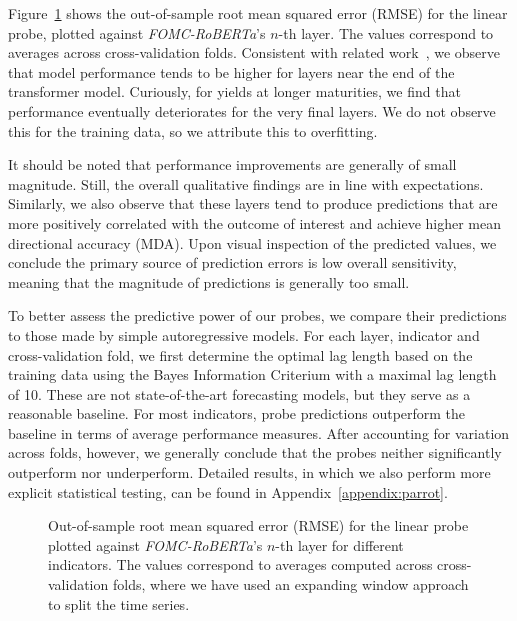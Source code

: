 \documentclass{article}
\theoremstyle{plain}
\theoremstyle{definition}
\theoremstyle{remark}
\begin{document}
Figure~\ref{fig-fomc} shows the out-of-sample root mean squared error (RMSE) for the linear probe, plotted against \emph{FOMC-RoBERTa}'s \(n\)-th layer. The values correspond to averages across cross-validation folds. Consistent with related work~\citep{alain2018understanding,gurnee2023languagev2}, we observe that model performance tends to be higher for layers near the end of the transformer model. Curiously, for yields at longer maturities, we find that performance eventually deteriorates for the very final layers. We do not observe this for the training data, so we attribute this to overfitting. 


It should be noted that performance improvements are generally of small magnitude. Still, the overall qualitative findings are in line with expectations. Similarly, we also observe that these layers tend to produce predictions that are more positively correlated with the outcome of interest and achieve higher mean directional accuracy (MDA). Upon visual inspection of the predicted values, we conclude the primary source of prediction errors is low overall sensitivity, meaning that the magnitude of predictions is generally too small. 

To better assess the predictive power of our probes, we compare their predictions to those made by simple autoregressive models. For each layer, indicator and cross-validation fold, we first determine the optimal lag length based on the training data using the Bayes Information Criterium with a maximal lag length of 10. These are not state-of-the-art forecasting models, but they serve as a reasonable baseline. For most indicators, probe predictions outperform the baseline in terms of average performance measures. After accounting for variation across folds, however, we generally conclude that the probes neither significantly outperform nor underperform. Detailed results, in which we also perform more explicit statistical testing, can be found in Appendix~\ref{appendix:parrot}.


\begin{figure}


\caption{\label{fig-fomc}Out-of-sample root mean squared error (RMSE) for the linear probe plotted against \emph{FOMC-RoBERTa}'s \(n\)-th layer for different indicators. The values correspond to averages computed across cross-validation folds, where we have used an expanding window approach to split the time series.}

\end{figure}%
\end{document}
